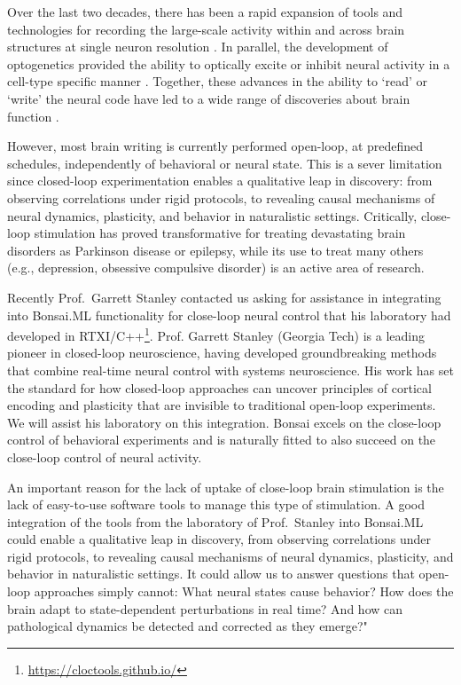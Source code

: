 Over the last two decades, there has been a rapid expansion of tools and
technologies for recording the large-scale activity within and across brain
structures at single neuron resolution \citep{}. In parallel, the development
of optogenetics provided the ability to optically excite or inhibit neural
activity in a cell-type specific manner \citep{}. Together, these advances in
the ability to `read' or `write' the neural code have led to a wide range of
discoveries about brain function \citep{}.

However, most brain writing is currently performed open-loop, at predefined
schedules, independently of behavioral or neural state. This is a sever
limitation since closed-loop experimentation enables a qualitative leap in
discovery: from observing correlations under rigid protocols, to revealing
causal mechanisms of neural dynamics, plasticity, and behavior in naturalistic
settings. Critically, close-loop stimulation has proved transformative for
treating devastating brain disorders as Parkinson disease or epilepsy, while
its use to treat many others (e.g., depression, obsessive
compulsive disorder) is an active area of research.

Recently Prof.~Garrett Stanley contacted us asking for assistance in
integrating into Bonsai.ML functionality for close-loop neural control that his
laboratory had developed in
RTXI/C++\footnote[6]{\url{https://cloctools.github.io/}}.
%
Prof. Garrett Stanley (Georgia Tech) is a leading pioneer in closed-loop
neuroscience, having developed groundbreaking methods that combine real-time
neural control with systems neuroscience. His work has set the standard for how
closed-loop approaches can uncover principles of cortical encoding and
plasticity that are invisible to traditional open-loop experiments.
%
We will assist his laboratory on this integration.
%
Bonsai excels on the close-loop control of behavioral experiments and is
naturally fitted to also succeed on the close-loop control of neural activity.

An important reason for the lack of uptake of close-loop brain stimulation is
the lack of easy-to-use software tools to manage this type of stimulation.
%
A good integration of the tools from the laboratory of Prof.~Stanley into
Bonsai.ML could enable a qualitative leap in discovery, from observing
correlations under rigid protocols, to revealing causal mechanisms of neural
dynamics, plasticity, and behavior in naturalistic settings.
%
It could allow us to answer questions that open-loop approaches simply cannot:
What neural states cause behavior? How does the brain adapt to state-dependent
perturbations in real time? And how can pathological dynamics be detected and
corrected as they emerge?"

